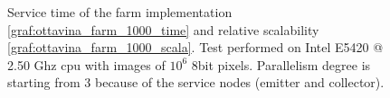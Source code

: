 \begin{figure}[p]
\centering
{}
\caption{ Service time of the farm implementation \ref{graf:ottavina_farm_1000_time} and relative scalability \ref{graf:ottavina_farm_1000_scala}. Test performed on Intel E5420 @ 2.50 Ghz cpu with images of $10^6$ 8bit pixels. Parallelism degree is starting from 3 because of the service nodes (emitter and collector). }
\label{chart:ottavina_farm_1000}
\end{figure}

